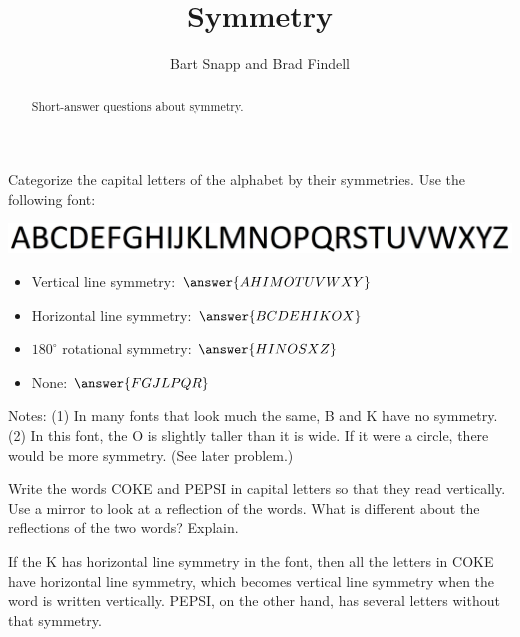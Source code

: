 \documentclass[nooutcomes]{ximera}
\title{Symmetry}
\author{Bart Snapp and Brad Findell}
\begin{document}
\begin{abstract}
Short-answer questions about symmetry. 
\end{abstract}
\maketitle

\begin{question}
Categorize the capital letters of the alphabet by their symmetries.  Use the following font: 
\begin{image}
\includegraphics{alphabet.png}
\end{image}
\begin{itemize}
\item Vertical line symmetry:  $\answer{AHIMOTUVWXY}$
\item Horizontal line symmetry:  $\answer{BCDEHIKOX}$  
\item $180^\circ$ rotational symmetry: $\answer{HINOSXZ}$
\item None: $\answer{FGJLPQR}$
\end{itemize}
\begin{feedback}[correct]
Notes:  (1) In many fonts that look much the same, B and K have no symmetry.  (2) In this font, the O is slightly taller than it is wide.  If it were a circle, there would be more symmetry.  (See later problem.)
\end{feedback}
\end{question}

\begin{question}
Write the words COKE and PEPSI in capital letters so that they read vertically.  Use a mirror to look at a reflection of the words.  What is different about the reflections of the two words?  Explain.  
\begin{freeResponse}
\begin{hint}
If the K has horizontal line symmetry in the font, then all the letters in COKE have horizontal line symmetry, which becomes vertical line symmetry when the word is written vertically. PEPSI, on the other hand, has several letters without that symmetry.  
\end{hint}
\end{freeResponse}
\end{question}
\end{document}
